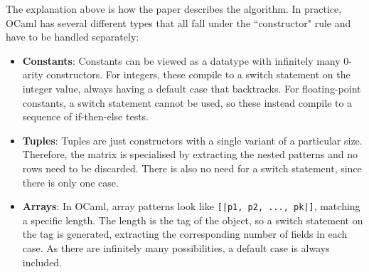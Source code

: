The explanation above is how the paper describes the algorithm. In practice, OCaml has several different types that all fall under the ``constructor" rule and have to be handled separately:
\begin{itemize}
\item \textbf{Constants}: Constants can be viewed as a datatype with infinitely many 0-arity constructors. For integers, these compile to a switch statement on the integer value, always having a default case that backtracks. For floating-point constants, a switch statement cannot be used, so these instead compile to a sequence of if-then-else tests.

\item \textbf{Tuples}: Tuples are just constructors with a single variant of a particular size. Therefore, the matrix is specialised by extracting the nested patterns and no rows need to be discarded. There is also no need for a switch statement, since there is only one case.

\item \textbf{Arrays}: In OCaml, array patterns look like \verb"[|p1, p2, ..., pk|]", matching a specific length. The length is the tag of the object, so a switch statement on the tag is generated, extracting the corresponding number of fields in each case. As there are infinitely many possibilities, a default case is always included.


\end{itemize}
